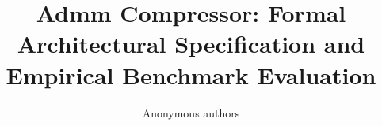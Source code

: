 \title{\textbf{Admm Compressor: Formal Architectural Specification and Empirical Benchmark Evaluation}}

\author{Anonymous authors}
